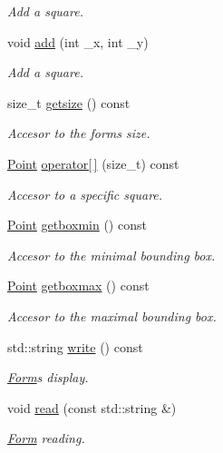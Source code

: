 \begin{DoxyCompactItemize}
\begin{DoxyCompactList}\small\item\em Add a square. \end{DoxyCompactList}\item 
void \hyperlink{class_form_a19fd6c5ca1ee574ca45af9c620d0c3da}{add} (int \+\_\+x, int \+\_\+y)
\begin{DoxyCompactList}\small\item\em Add a square. \end{DoxyCompactList}\item 
size\+\_\+t \hyperlink{class_form_a59a8c1139f5f0efee5a483aea004b421}{getsize} () const
\begin{DoxyCompactList}\small\item\em Accesor to the form\textquotesingle{}s size. \end{DoxyCompactList}\item 
\hyperlink{struct_point}{Point} \hyperlink{class_form_a9c1a9c10ec318bac8c67a8c7d9d5e1ed}{operator\mbox{[}$\,$\mbox{]}} (size\+\_\+t) const
\begin{DoxyCompactList}\small\item\em Accesor to a specific square. \end{DoxyCompactList}\item 
\hyperlink{struct_point}{Point} \hyperlink{class_form_a19ec5bfe99ab4266e549ace55a82ea9f}{getboxmin} () const
\begin{DoxyCompactList}\small\item\em Accesor to the minimal bounding box. \end{DoxyCompactList}\item 
\hyperlink{struct_point}{Point} \hyperlink{class_form_aaffcebdc148fd9ebf84fedcba0849ab4}{getboxmax} () const
\begin{DoxyCompactList}\small\item\em Accesor to the maximal bounding box. \end{DoxyCompactList}\item 
std\+::string \hyperlink{class_form_a5502780700cacbbf51304320cb94d88d}{write} () const
\begin{DoxyCompactList}\small\item\em \hyperlink{class_form}{Form}\textquotesingle{}s display. \end{DoxyCompactList}\item 
void \hyperlink{class_form_aedc0125caaf7c1fcbc8c5104a7bd0154}{read} (const std\+::string \&)
\begin{DoxyCompactList}\small\item\em \hyperlink{class_form}{Form} reading. \end{DoxyCompactList}\end{DoxyCompactItemize}


